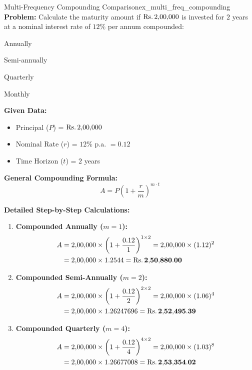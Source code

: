 \begin{example}{Multi-Frequency Compounding Comparison}{ex_multi_freq_compounding}
\textbf{Problem:}
Calculate the maturity amount if $\text{Rs.}\, 2{,}00{,}000$ is invested for $2$ years at a nominal interest rate of $12\%$ per annum compounded:
\begin{enumerate*}[label=(\alph*), itemjoin=\quad]
    \item Annually
    \item Semi-annually
    \item Quarterly
    \item Monthly
\end{enumerate*}

\tcbline
\textbf{Given Data:}
\begin{itemize}[noitemsep]
    \item Principal ($P$) = $\text{Rs.}\, 2{,}00{,}000$
    \item Nominal Rate ($r$) = $12\%$ p.a. $= 0.12$
    \item Time Horizon ($t$) = $2$ years
\end{itemize}

\textbf{General Compounding Formula:}
\begin{equation*}
    A = P \left(1 + \frac{r}{m}\right)^{m \cdot t}
\end{equation*}

\textbf{Detailed Step-by-Step Calculations:}
\begin{enumerate}[leftmargin=*]
    \item \textbf{Compounded Annually ($m = 1$):}
    \begin{align*}
        A &= 2{,}00{,}000 \times \left(1 + \frac{0.12}{1}\right)^{1 \times 2} = 2{,}00{,}000 \times (1.12)^2 \\
        &= 2{,}00{,}000 \times 1.2544 = \mathbf{\text{Rs.}\, 2{,}50{,}880.00}
    \end{align*}

    \item \textbf{Compounded Semi-Annually ($m = 2$):}
    \begin{align*}
        A &= 2{,}00{,}000 \times \left(1 + \frac{0.12}{2}\right)^{2 \times 2} = 2{,}00{,}000 \times (1.06)^4 \\
        &= 2{,}00{,}000 \times 1.26247696 = \mathbf{\text{Rs.}\, 2{,}52{,}495.39}
    \end{align*}

    \item \textbf{Compounded Quarterly ($m = 4$):}
    \begin{align*}
        A &= 2{,}00{,}000 \times \left(1 + \frac{0.12}{4}\right)^{4 \times 2} = 2{,}00{,}000 \times (1.03)^8 \\
        &= 2{,}00{,}000 \times 1.26677008 = \mathbf{\text{Rs.}\, 2{,}53{,}354.02}
    \end{align*}


\end{enumerate}
\end{example}
